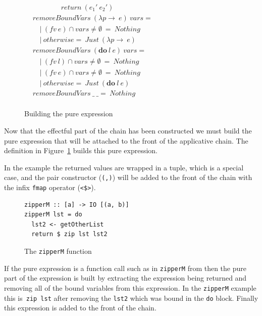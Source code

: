 \begin{figure}[h!]
\begin{math}
\begin{aligned}
&\qquad \qquad return\ (e_1'\ e_2')\\
&removeBoundVars\ (\lambda p \rightarrow\ e)\ vars =\\
&\quad |\ (fv\ e) \cap vars \neq \emptyset\ =\ Nothing\\
&\quad |\ otherwise =\ Just\ (\lambda p \rightarrow\ e)\\
&removeBoundVars\ (\textbf{do}\ l\ e)\ vars =\\
&\quad |\ (fv\ l) \cap vars \neq \emptyset\ =\ Nothing\\
&\quad |\ (fv\ e) \cap vars \neq \emptyset\ =\ Nothing\\
&\quad |\ otherwise =\ Just\ (\textbf{do}\ l\ e)\\
&removeBoundVars\ \_\ \_ =\ Nothing\\
\end{aligned}
\end{math}
\caption{Building the pure expression}
\label{pure}
\end{figure}
Now that the effectful part of the chain has been constructed we must build the pure expression that will be attached to the front of the applicative chain. The definition in Figure~\ref{pure} builds this pure expression. 

In the \DIFdelbegin {}\DIFdelend \DIFaddbegin {}\DIFaddend example the returned values are wrapped in a tuple, which is a special case, and the pair constructor (\texttt{(,)}) will be added to the front of the chain with the infix \texttt{fmap} operator (\texttt{<\$>}).

\begin{figure}[t]
\begin{lstlisting}
zipperM :: [a] -> IO [(a, b)]
zipperM lst = do
  lst2 <- getOtherList
  return $ zip lst lst2
\end{lstlisting}
\caption{The \texttt{zipperM} function}
\label{zipperM}
\end{figure}

If the pure expression is \DIFdelbegin {}\DIFdelend a function call such as in \texttt{zipperM} from \DIFdelbegin {}\DIFdelend \DIFaddbegin {}\DIFaddend then the pure part of the expression is built by extracting the expression being returned and removing all of the bound variables from this expression. In the \texttt{zipperM} example this is\DIFdelbegin {}\DIFdelend ~\texttt{zip lst} after removing the \texttt{lst2} which was bound in the \texttt{do} block. Finally this expression is \DIFdelbegin {}\DIFdelend added to the front of the chain.

